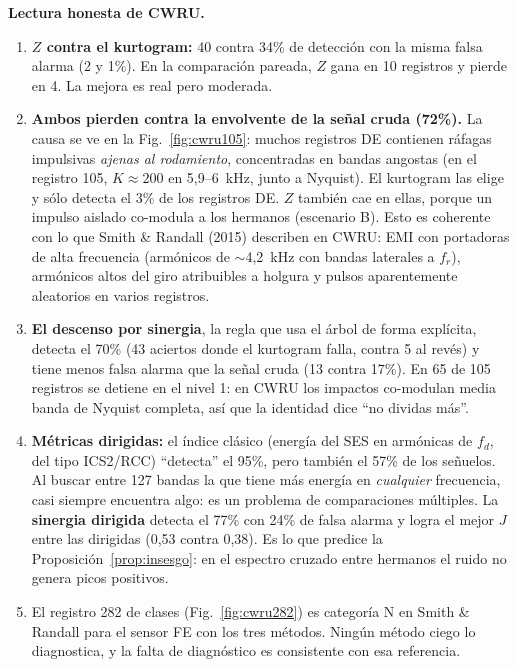 \noindent\textbf{Lectura honesta de CWRU.}
\begin{enumerate}[leftmargin=*,itemsep=2pt]
\item \textbf{$Z$ contra el kurtogram:} 40 contra 34\% de detección con la misma falsa alarma (2 y 1\%). En la comparación pareada, $Z$ gana en 10 registros y pierde en 4. La mejora es real pero moderada.
\item \textbf{Ambos pierden contra la envolvente de la señal cruda (72\%).} La causa se ve en la Fig.~\ref{fig:cwru105}: muchos registros DE contienen ráfagas impulsivas \emph{ajenas al rodamiento}, concentradas en bandas angostas (en el registro 105, $K\approx200$ en 5{,}9--6~kHz, junto a Nyquist). El kurtogram las elige y sólo detecta el 3\% de los registros DE. $Z$ también cae en ellas, porque un impulso aislado co-modula a los hermanos (escenario B). Esto es coherente con lo que Smith \& Randall (2015) describen en CWRU: EMI con portadoras de alta frecuencia (armónicos de $\sim$4{,}2~kHz con bandas laterales a $f_r$), armónicos altos del giro atribuibles a holgura y pulsos aparentemente aleatorios en varios registros.
\item \textbf{El descenso por sinergia}, la regla que usa el árbol de forma explícita, detecta el 70\% (43 aciertos donde el kurtogram falla, contra 5 al revés) y tiene menos falsa alarma que la señal cruda (13 contra 17\%). En 65 de 105 registros se detiene en el nivel 1: en CWRU los impactos co-modulan media banda de Nyquist completa, así que la identidad dice ``no dividas más''.
\item \textbf{Métricas dirigidas:} el índice clásico (energía del SES en armónicas de $f_d$, del tipo ICS2/RCC) ``detecta'' el 95\%, pero también el 57\% de los señuelos. Al buscar entre 127 bandas la que tiene más energía en \emph{cualquier} frecuencia, casi siempre encuentra algo: es un problema de comparaciones múltiples. La \textbf{sinergia dirigida} detecta el 77\% con 24\% de falsa alarma y logra el mejor $J$ entre las dirigidas (0{,}53 contra 0{,}38). Es lo que predice la Proposición~\ref{prop:insesgo}: en el espectro cruzado entre hermanos el ruido no genera picos positivos.
\item El registro 282 de clases (Fig.~\ref{fig:cwru282}) es categoría N en Smith \& Randall para el sensor FE con los tres métodos. Ningún método ciego lo diagnostica, y la falta de diagnóstico es consistente con esa referencia.
\end{enumerate}


